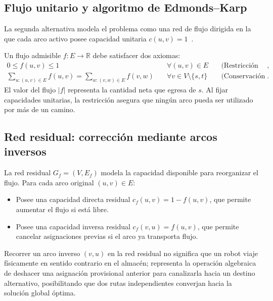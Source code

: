 \documentclass[11pt,a4paper]{article}
\newcommand{\tema}[1]{\subsection*{\color{verde}#1}}
\begin{document}
\subsection{Flujo unitario y algoritmo de Edmonds–Karp}
La segunda alternativa modela el problema como una red de flujo dirigida en la que cada arco activo posee capacidad unitaria $c(u, v) = 1$~\cite{cormen,edmondskarp}.

Un flujo admisible $f: E \to \mathbb{R}$ debe satisfacer dos axiomas:
\begin{align}
  0 \le f(u, v) \le 1 & \quad \forall (u, v) \in E \quad &\text{(Restricción de capacidad)}, \\
  \sum_{u:(u,v) \in E} f(u, v) = \sum_{w:(v,w) \in E} f(v, w) & \quad \forall v \in V \setminus \{s, t\} \quad &\text{(Conservación en nodos intermedios)}.
\end{align}
El valor del flujo $|f|$ representa la cantidad neta que egresa de $s$. Al fijar capacidades unitarias, la restricción asegura que ningún arco pueda ser utilizado por más de un camino.

\tema{Red residual: corrección mediante arcos inversos}
La red residual $G_f = (V, E_f)$ modela la capacidad disponible para reorganizar el flujo. Para cada arco original $(u, v) \in E$:
\begin{itemize}
  \item Posee una capacidad directa residual $c_f(u, v) = 1 - f(u, v)$, que permite aumentar el flujo si está libre.
  \item Posee una capacidad inversa residual $c_f(v, u) = f(u, v)$, que permite cancelar asignaciones previas si el arco ya transporta flujo.
\end{itemize}
Recorrer un arco inverso $(v, u)$ en la red residual no significa que un robot viaje físicamente en sentido contrario en el almacén; representa la operación algebraica de deshacer una asignación provisional anterior para canalizarla hacia un destino alternativo, posibilitando que dos rutas independientes converjan hacia la solución global óptima.
\end{document}
